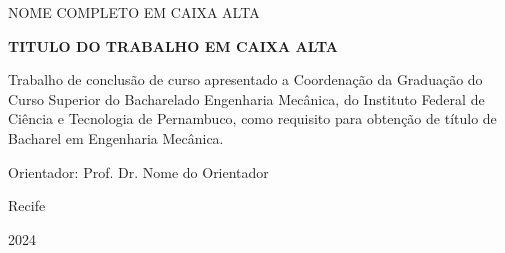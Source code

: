 \begin{center}
	
	NOME COMPLETO EM CAIXA ALTA

	\vspace{6cm}

	\textbf{TITULO DO TRABALHO EM CAIXA ALTA}
	
\end{center}

\vspace{1cm}

	\hfill\begin{minipage}{0.5\linewidth}
		{Trabalho de conclusão de curso apresentado a Coordenação da Graduação do Curso Superior do Bacharelado Engenharia Mecânica, do Instituto Federal de Ciência e Tecnologia de Pernambuco, como requisito para obtenção de título de Bacharel em Engenharia Mecânica.
		
		Orientador: Prof. Dr. Nome do Orientador
	

		}

\end{minipage}

\vfill{}

\begin{center}

	Recife

	\vspace{0.2cm}

	2024

\end{center}

\thispagestyle{empty}

